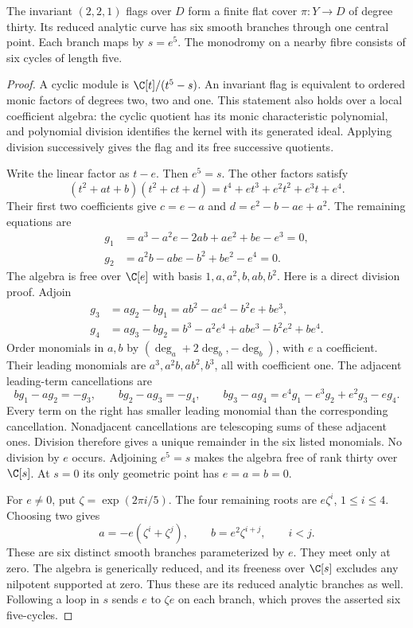 \begin{proposition}
\label{fl221:prop:cover}
The invariant $(2,2,1)$ flags over $D$ form a finite flat cover
$\pi:Y\to D$ of degree thirty. Its reduced analytic curve has six
smooth branches through one central point. Each branch maps by
$s=e^5$. The monodromy on a nearby fibre consists of six cycles
of length five.
\end{proposition}

\begin{proof}
A cyclic module is $\C[t]/(t^5-s)$. An invariant flag is equivalent
to ordered monic factors of degrees two, two and one. This statement
also holds over a local coefficient algebra: the cyclic quotient
has its monic characteristic polynomial, and polynomial division
identifies the kernel with its generated ideal. Applying division
successively gives the flag and its free successive quotients.

Write the linear factor as $t-e$. Then $e^5=s$. The other factors
satisfy
\[
 (t^2+at+b)(t^2+ct+d)=t^4+et^3+e^2t^2+e^3t+e^4.
\]
Their first two coefficients give
$c=e-a$ and $d=e^2-b-ae+a^2$. The remaining equations are
\[
\begin{split}
 g_1&=a^3-a^2e-2ab+ae^2+be-e^3=0,\\
 g_2&=a^2b-abe-b^2+be^2-e^4=0.
\end{split}
\]
The algebra is free over $\C[e]$ with basis
$1,a,a^2,b,ab,b^2$. Here is a direct division proof.
Adjoin
\[
\begin{split}
 g_3&=ag_2-bg_1=ab^2-ae^4-b^2e+be^3,\\
 g_4&=ag_3-bg_2=b^3-a^2e^4+abe^3-b^2e^2+be^4.
\end{split}
\]
Order monomials in $a,b$ by $(\deg_a+2\deg_b,-\deg_b)$,
with $e$ a coefficient. Their leading monomials are
$a^3,a^2b,ab^2,b^3$, all with coefficient one.
The adjacent leading-term cancellations are
\[
 bg_1-ag_2=-g_3,\qquad bg_2-ag_3=-g_4,\qquad
 bg_3-ag_4=e^4g_1-e^3g_2+e^2g_3-eg_4.
\]
Every term on the right has smaller leading monomial than the
corresponding cancellation. Nonadjacent cancellations are telescoping
sums of these adjacent ones. Division therefore gives a unique
remainder in the six listed monomials. No division by $e$ occurs.
Adjoining $e^5=s$ makes the algebra free of rank thirty over $\C[s]$.
At $s=0$ its only geometric point has $e=a=b=0$.

For $e\ne0$, put $\zeta=\exp(2\pi i/5)$. The four remaining roots
are $e\zeta^i$, $1\le i\le4$. Choosing two gives
\[
 a=-e(\zeta^i+\zeta^j),\qquad b=e^2\zeta^{i+j},\qquad i<j.
\]
These are six distinct smooth branches parameterized by $e$.
They meet only at zero. The algebra is generically reduced, and
its freeness over $\C[s]$ excludes any nilpotent supported at zero.
Thus these are its reduced analytic branches as well.
Following a loop in $s$ sends $e$ to $\zeta e$ on each branch,
which proves the asserted six five-cycles.
\end{proof}

